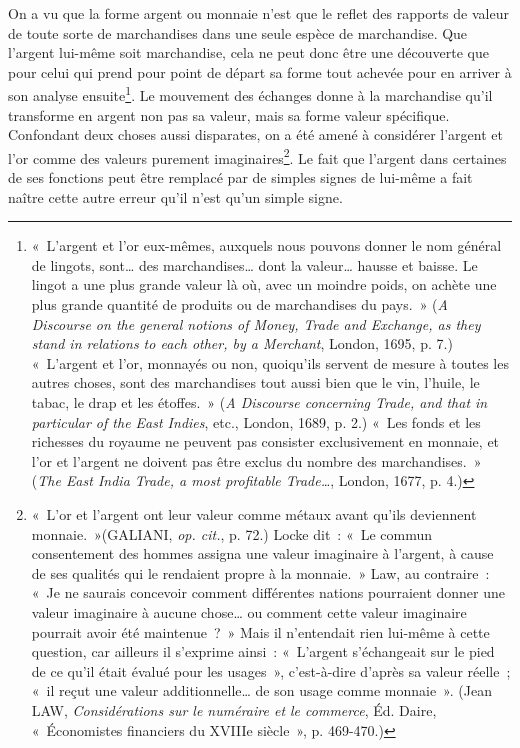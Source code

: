\documentclass[french,twoside]{book} %
\begin{document}
On a vu que la forme argent ou monnaie n’est que le reflet des rapports de valeur de toute sorte de marchandises dans une seule espèce de marchandise. Que l’argent lui-même soit marchandise, cela ne peut donc être une découverte que pour celui qui prend pour point de départ sa forme tout achevée pour en arriver à son analyse ensuite\footnote{« L’argent et l’or eux-mêmes, auxquels nous pouvons donner le nom général de lingots, sont… des marchandises… dont la valeur… hausse et baisse. Le lingot a une plus grande valeur là où, avec un moindre poids, on achète une plus grande quantité de produits ou de marchandises du pays. » (\emph{A Discourse on the general notions of Money, Trade and Exchange, as they stand in relations to each other, by a Merchant}, London, 1695, p. 7.) « L’argent et l’or, monnayés ou non, quoiqu’ils servent de mesure à toutes les autres choses, sont des marchandises tout aussi bien que le vin, l’huile, le tabac, le drap et les étoffes. » (\emph{A Discourse concerning Trade, and that in particular of the East Indies}, etc., London, 1689, p. 2.) « Les fonds et les richesses du royaume ne peuvent pas consister exclusivement en monnaie, et l’or et l’argent ne doivent pas être exclus du nombre des marchandises. » (\emph{The East India Trade, a most profitable Trade…}, London, 1677, p. 4.)}. Le mouvement des échanges donne à la marchandise qu’il transforme en argent non pas sa valeur, mais sa forme valeur spécifique. Confondant deux choses aussi disparates, on a été amené à considérer l’argent et l’or comme des valeurs purement imaginaires\footnote{« L’or et l’argent ont leur valeur comme métaux avant qu’ils deviennent monnaie. »(GALIANI, \emph{op. cit.}, p. 72.) Locke dit : « Le commun consentement des hommes assigna une valeur imaginaire à l’argent, à cause de ses qualités qui le rendaient propre à la monnaie. » Law, au contraire : « Je ne saurais concevoir comment différentes nations pourraient donner une valeur imaginaire à aucune chose… ou comment cette valeur imaginaire pourrait avoir été maintenue ? » Mais il n’entendait rien lui-même à cette question, car ailleurs il s’exprime ainsi : « L’argent s’échangeait sur le pied de ce qu’il était évalué pour les usages », c’est-à-dire d’après sa valeur réelle ; « il reçut une valeur additionnelle… de son usage comme monnaie ». (Jean LAW, \emph{Considérations sur le numéraire et le commerce}, Éd. Daire, « Économistes financiers du XVIIIe siècle », p. 469-470.)}. Le fait que l’argent dans certaines de ses fonctions peut être remplacé par de simples signes de lui-même a fait naître cette autre erreur qu’il n’est qu’un simple signe.\par
\end{document}
